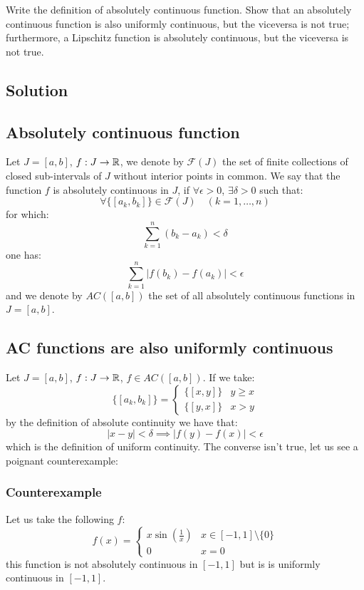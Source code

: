 \sheet


\question
Write the definition of absolutely continuous function. Show that an absolutely continuous function is also uniformly continuous, but the viceversa is not true; furthermore, a Lipschitz function is absolutely continuous, but the viceversa is not true.

\subsection*{Solution}

\subsection{Absolutely continuous function}
Let $J=[a,b]$,  $f:J\to\mathbb{R}$, we denote by $\mathcal{F}(J)$ the set of finite collections of closed sub-intervals of $J$ without interior points in common.
We say that the function $f$ is absolutely continuous in $J$, if $\forall \epsilon > 0$, $\exists \delta > 0$ such that:
\[
    \forall \{ [a_k, b_k]\} \in \mathcal{F}(J) \quad (k=1,\dots,n)    
\]
for which:
\[
    \sum_{k=1}^n (b_k-a_k) < \delta   
\]
one has:
\[
    \sum_{k=1}^n |f(b_k)-f(a_k)| < \epsilon    
\]
and we denote by $AC([a,b])$ the set of all absolutely continuous functions in $J=[a,b]$.

\subsection{AC functions are also uniformly continuous}
Let $J=[a,b]$, $f:J\to\mathbb{R}$, $f \in AC([a,b])$. If we take:
\[
    \{ [a_k, b_k] \} = \begin{cases}
        \{ [x,y] \} & y \geq x \\
        \{ [y,x] \} & x > y
    \end{cases}
\]
by the definition of absolute continuity we have that:
\[
    |x-y| < \delta \implies |f(y) - f(x)| < \epsilon    
\]
which is the definition of uniform continuity.
The converse isn't true, let us see a poignant counterexample:

\subsubsection{Counterexample}
Let us take the following $f$:
\[
    f(x) = \begin{cases}
       x \sin(\frac{1}{x}) & x\in[-1,1]\setminus\{0\} \\
       0 & x=0
    \end{cases}    
\]
this function is not absolutely continuous in $[-1,1]$ but is  is uniformly continuous in $[-1,1]$.

